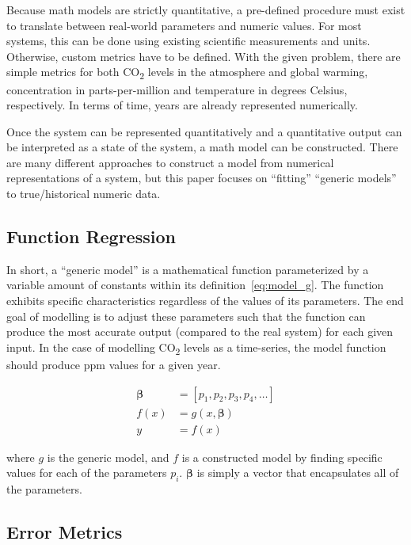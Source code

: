 \documentclass{mcmthesis}
\begin{document}
    Because math models are strictly quantitative, a pre-defined procedure must exist to translate between real-world parameters and numeric values. For most systems, this can be done using existing scientific measurements and units. Otherwise, custom metrics have to be defined. With the given problem, there are simple metrics for both CO\textsubscript{2} levels in the atmosphere and global warming, concentration in parts-per-million and temperature in degrees Celsius, respectively. In terms of time, years are already represented numerically.

    Once the system can be represented quantitatively and a quantitative output can be interpreted as a state of the system, a math model can be constructed. There are many different approaches to construct a model from numerical representations of a system, but this paper focuses on ``fitting'' ``generic models'' to true/historical numeric data.

    \subsection{Function Regression}

    In short, a ``generic model'' is a mathematical function parameterized by a variable amount of constants within its definition~\eqref{eq:model_g}. The function exhibits specific characteristics regardless of the values of its parameters. The end goal of modelling is to adjust these parameters such that the function can produce the most accurate output (compared to the real system) for each given input. In the case of modelling CO\textsubscript{2} levels as a time-series, the model function should produce ppm values for a given year.

    \begin{equation}
        \begin{aligned}
            \bm{\beta} &= [p_1, p_2, p_3, p_4, \dots] \\
            f(x) &= g(x, \bm{\beta}) \\
            y &= f(x)
        \end{aligned}
        \label{eq:model_g}
    \end{equation}

    \noindent where $g$ is the generic model, and $f$ is a constructed model by finding specific values for each of the parameters $p_i$. $\bm{\beta}$ is simply a vector that encapsulates all of the parameters.

    \subsection{Error Metrics}
\end{document}
